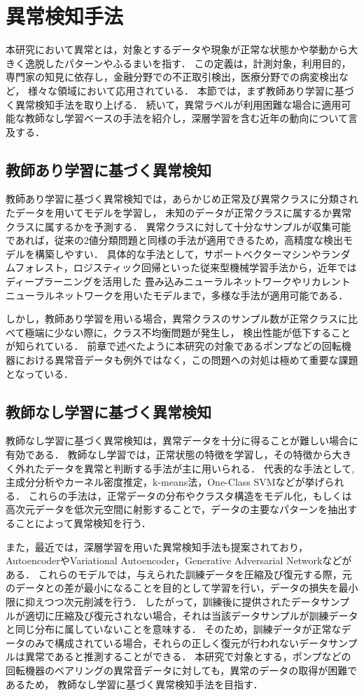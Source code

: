 \documentclass[../main]{subfiles}
\begin{document}
\section{異常検知手法}
\label{sec:related_work_anomaly}
本研究において異常とは，対象とするデータや現象が正常な状態かや挙動から大きく逸脱したパターンやふるまいを指す．
この定義は，計測対象，利用目的，専門家の知見に依存し，金融分野での不正取引検出，医療分野での病変検出など，
様々な領域において応用されている．
本節では，まず教師あり学習に基づく異常検知手法を取り上げる．
続いて，異常ラベルが利用困難な場合に適用可能な教師なし学習ベースの手法を紹介し，深層学習を含む近年の動向について言及する．
\subsection{教師あり学習に基づく異常検知}
教師あり学習に基づく異常検知では，あらかじめ正常及び異常クラスに分類されたデータを用いてモデルを学習し，
未知のデータが正常クラスに属するか異常クラスに属するかを予測する．
異常クラスに対して十分なサンプルが収集可能であれば，従来の2値分類問題と同様の手法が適用できるため，高精度な検出モデルを構築しやすい．
具体的な手法として，サポートベクターマシンやランダムフォレスト，ロジスティック回帰といった従来型機械学習手法から，近年ではディープラーニングを活用した
畳み込みニューラルネットワークやリカレントニューラルネットワークを用いたモデルまで，多様な手法が適用可能である．

しかし，教師あり学習を用いる場合，異常クラスのサンプル数が正常クラスに比べて極端に少ない際に，クラス不均衡問題が発生し，
検出性能が低下することが知られている．
前章で述べたように本研究の対象であるポンプなどの回転機器における異常音データも例外ではなく，この問題への対処は極めて重要な課題となっている．

\subsection{教師なし学習に基づく異常検知}
教師なし学習に基づく異常検知は，異常データを十分に得ることが難しい場合に有効である．
教師なし学習では，正常状態の特徴を学習し，その特徴から大きく外れたデータを異常と判断する手法が主に用いられる．
代表的な手法として, 主成分分析やカーネル密度推定，k-means法，One-Class SVMなどが挙げられる．
これらの手法は，正常データの分布やクラスタ構造をモデル化，もしくは高次元データを低次元空間に射影することで，データの主要なパターンを抽出することによって異常検知を行う．

また，最近では，深層学習を用いた異常検知手法も提案されており，AutoencoderやVariational Autoencoder，Generative Adversarial Networkなどがある．
これらのモデルでは，与えられた訓練データを圧縮及び復元する際，元のデータとの差が最小になることを目的として学習を行い，データの損失を最小限に抑えつつ次元削減を行う．
したがって，訓練後に提供されたデータサンプルが適切に圧縮及び復元されない場合，それは当該データサンプルが訓練データと同じ分布に属していないことを意味する．
そのため，訓練データが正常なデータのみで構成されている場合，それらの正しく復元が行われないデータサンプルは異常であると推測することができる．
本研究で対象とする，ポンプなどの回転機器のベアリングの異常音データに対しても，異常のデータの取得が困難であるため，
教師なし学習に基づく異常検知手法を目指す．
\end{document}
